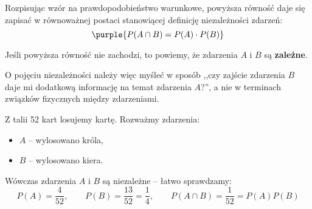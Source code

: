 Rozpisując wzór na prawdopodobieństwo warunkowe, powyższa równość daje się zapisać w równoważnej postaci stanowiącej definicję niezależności zdarzeń:
$$\purple{P(A \cap B) = P(A) \cdot P(B)}$$

Jeśli powyższa równość nie zachodzi, to powiemy, że zdarzenia $A$ i $B$ są \textbf{zależne}.

O pojęciu niezależności należy więc myśleć w sposób ,,czy zajście zdarzenia $B$ daje mi dodatkową informację na temat zdarzenia $A$?'', a nie w terminach związków fizycznych między zdarzeniami.

\begin{example}
    Z talii 52 kart losujemy kartę. Rozważmy zdarzenia:
    \begin{itemize}
        \item $A$ -- wylosowano króla,
        \item $B$ -- wylosowano kiera.
    \end{itemize}

    Wówczas zdarzenia $A$ i $B$ są niezależne -- łatwo sprawdzamy:
    $$P(A) = \frac{4}{52}, \qquad P(B) = \frac{13}{52} = \frac{1}{4}, \qquad P(A \cap B) = \frac{1}{52} = P(A)P(B)$$
\end{example}

